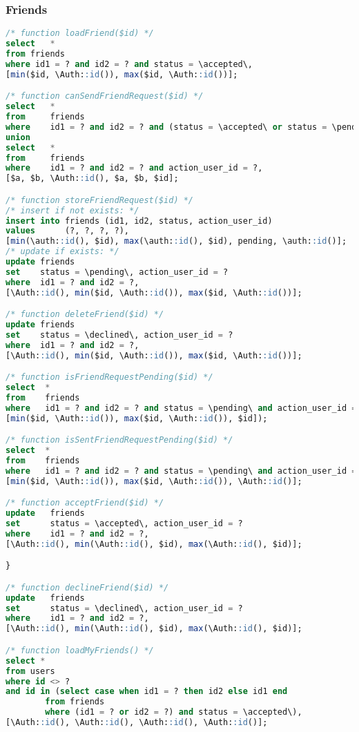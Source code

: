 \subsubsection{Friends}
\begin{lstlisting}[language=sql]
/* function loadFriend($id) */
select   *
from friends
where id1 = ? and id2 = ? and status = \accepted\,
[min($id, \Auth::id()), max($id, \Auth::id())];

/* function canSendFriendRequest($id) */
select   *
from     friends
where    id1 = ? and id2 = ? and (status = \accepted\ or status = \pending\) and action_user_id = ?
union
select   *
from     friends
where    id1 = ? and id2 = ? and action_user_id = ?,
[$a, $b, \Auth::id(), $a, $b, $id];

/* function storeFriendRequest($id) */
/* insert if not exists: */
insert into friends (id1, id2, status, action_user_id)
values      (?, ?, ?, ?),
[min(\auth::id(), $id), max(\auth::id(), $id), pending, \auth::id()];
/* update if exists: */
update friends
set    status = \pending\, action_user_id = ?
where  id1 = ? and id2 = ?,
[\Auth::id(), min($id, \Auth::id()), max($id, \Auth::id())];

/* function deleteFriend($id) */
update friends
set    status = \declined\, action_user_id = ?
where  id1 = ? and id2 = ?,
[\Auth::id(), min($id, \Auth::id()), max($id, \Auth::id())];

/* function isFriendRequestPending($id) */
select  *
from    friends
where   id1 = ? and id2 = ? and status = \pending\ and action_user_id = ?,
[min($id, \Auth::id()), max($id, \Auth::id()), $id]);

/* function isSentFriendRequestPending($id) */
select  *
from    friends
where   id1 = ? and id2 = ? and status = \pending\ and action_user_id = ?,
[min($id, \Auth::id()), max($id, \Auth::id()), \Auth::id()];

/* function acceptFriend($id) */
update   friends
set      status = \accepted\, action_user_id = ?
where    id1 = ? and id2 = ?,
[\Auth::id(), min(\Auth::id(), $id), max(\Auth::id(), $id)];

}

/* function declineFriend($id) */
update   friends
set      status = \declined\, action_user_id = ?
where    id1 = ? and id2 = ?,
[\Auth::id(), min(\Auth::id(), $id), max(\Auth::id(), $id)];

/* function loadMyFriends() */
select *
from users
where id <> ?
and id in (select case when id1 = ? then id2 else id1 end
        from friends
        where (id1 = ? or id2 = ?) and status = \accepted\),
[\Auth::id(), \Auth::id(), \Auth::id(), \Auth::id()];

\end{lstlisting}
